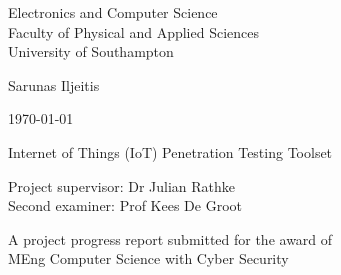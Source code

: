 \begin{titlepage}
   \begin{center}
       \vspace*{1cm}
 
       {\huge Electronics and Computer Science \\ 
       Faculty of Physical and Applied Sciences \\
       University of Southampton
       }
 
 
       \vspace{1.5cm}
 
       {\Large Sarunas Iljeitis}
       
       \vspace{0.2cm}
       
       \today
       
       \vspace{1cm}
       
       {\huge Internet of Things (IoT) Penetration Testing Toolset}
 
       \vfill
       
       {\Large
        Project supervisor: Dr Julian Rathke \\
       Second examiner:  Prof Kees De Groot}
 
       \vspace{1.5cm}
 
       \Large
       A project progress report submitted for the award of \\
       MEng Computer Science with Cyber Security
       
       
       \vspace{0.8cm}
 
   \end{center}
\end{titlepage}